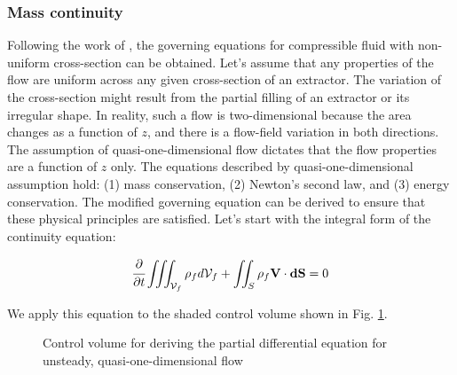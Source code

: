 \documentclass[../Article_Model_Parameters.tex]{subfiles}
\begin{document}
	
	\label{CH: Gouverning equations}
	
	\subsubsection{Mass continuity}

	Following the work of \citet{Anderson1995}, the governing equations for compressible fluid with non-uniform cross-section can be obtained. Let's assume that any properties of the flow are uniform across any given cross-section of an extractor. The variation of the cross-section might result from the partial filling of an extractor or its irregular shape. In reality, such a flow is two-dimensional because the area changes as a function of $z$, and there is a flow-field variation in both directions. The assumption of quasi-one-dimensional flow dictates that the flow properties are a function of $z$ only. The equations described by quasi-one-dimensional assumption hold: (1) mass conservation, (2) Newton's second law, and (3) energy conservation. The modified governing equation can be derived to ensure that these physical principles are satisfied.	Let's start with the integral form of the continuity equation:
	
	{\footnotesize
		\begin{equation}
			\cfrac{\partial}{\partial t} \iiint_{\mathcal{V}_f} \rho_f d\mathcal{V}_f + \iint_S \rho_f \textbf{V} \cdot \textbf{dS} = 0
			\label{EQ: Continuity_integral_general}
		\end{equation}
	}
	
	We apply this equation to the shaded control volume shown in Fig. \ref{fig: control_volume}. 
	
	\begin{figure}[h]
		\centering
		\caption{Control volume for deriving the partial differential equation for unsteady, quasi-one-dimensional flow}
		\label{fig: control_volume}
	\end{figure}
	
\end{document}
